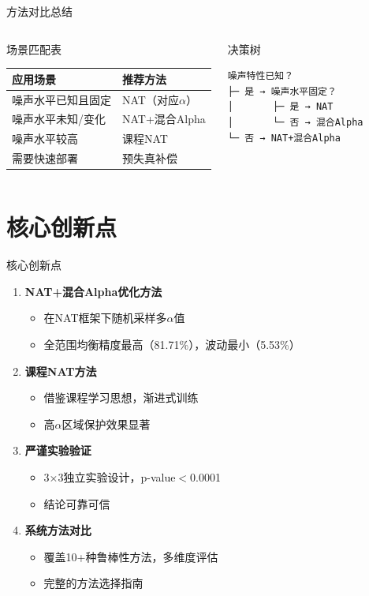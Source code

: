 \documentclass[aspectratio=169]{beamer}
\begin{document}
\begin{frame}{方法对比总结}
\begin{columns}
\begin{block}{场景匹配表}
\begin{table}
\centering
\begin{tabular}{ll}
\toprule
\textbf{应用场景} & \textbf{推荐方法} \\
\midrule
噪声水平已知且固定 & NAT（对应$\alpha$） \\
噪声水平未知/变化 & NAT+混合Alpha \\
噪声水平较高 & 课程NAT \\
需要快速部署 & 预失真补偿 \\
\bottomrule
\end{tabular}
\end{table}
\end{block}
\begin{block}{决策树}
\tiny
\begin{verbatim}
噪声特性已知？
├─ 是 → 噪声水平固定？
│       ├─ 是 → NAT
│       └─ 否 → 混合Alpha
└─ 否 → NAT+混合Alpha
\end{verbatim}
\end{block}
\end{columns}
\end{frame}

\section{核心创新点}
\begin{frame}{核心创新点}
\begin{enumerate}
\item \textbf{NAT+混合Alpha优化方法}
\begin{itemize}
\item 在NAT框架下随机采样多$\alpha$值
\item 全范围均衡精度最高（81.71\%），波动最小（5.53\%）
\end{itemize}
\vfill
\item \textbf{课程NAT方法}
\begin{itemize}
\item 借鉴课程学习思想，渐进式训练
\item 高$\alpha$区域保护效果显著
\end{itemize}
\vfill
\item \textbf{严谨实验验证}
\begin{itemize}
\item 3×3独立实验设计，p-value$<$0.0001
\item 结论可靠可信
\end{itemize}
\vfill
\item \textbf{系统方法对比}
\begin{itemize}
\item 覆盖10+种鲁棒性方法，多维度评估
\item 完整的方法选择指南
\end{itemize}
\end{enumerate}
\end{frame}
\end{document}
